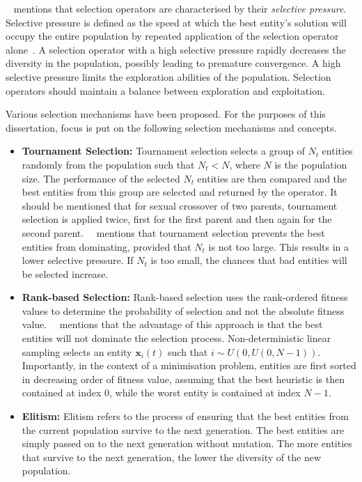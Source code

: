 \citeauthor{ref:engelbrecht:2007}~\cite{ref:engelbrecht:2007} mentions that selection operators are characterised by their \textit{selective pressure}. Selective pressure is defined as the speed at which the best entity's solution will occupy the entire population by repeated application of the selection operator alone~\cite{ref:back:1994}. A selection operator with a high selective pressure rapidly decreases the diversity in the population, possibly leading to premature convergence. A high selective pressure limits the exploration abilities of the population. Selection operators should maintain a balance between exploration and exploitation.

Various selection mechanisms have been proposed. For the purposes of this dissertation, focus is put on the following selection mechanisms and concepts.

\begin{itemize}
      \item \textbf{Tournament Selection:} Tournament selection selects a group of $N_{t}$ entities randomly from the population such that $N_{t} < N$, where $N$ is the population size. The performance of the selected $N_{t}$ entities are then compared and the best entities from this group are selected and returned by the operator. It should be mentioned that for sexual crossover of two parents, tournament selection is applied twice, first for the first parent and then again for the second parent.~\citeauthor{ref:engelbrecht:2007}~\cite{ref:engelbrecht:2007} mentions that tournament selection prevents the best entities from dominating, provided that $N_{t}$ is not too large. This results in a lower selective pressure. If $N_{t}$ is too small, the chances that bad entities will be selected increase.

      \item \textbf{Rank-based Selection:} Rank-based selection uses the rank-ordered fitness values to determine the probability of selection and not the absolute fitness value.~\citeauthor{ref:engelbrecht:2007}~\cite{ref:engelbrecht:2007} mentions that the advantage of this approach is that the best entities will not dominate the selection process. Non-deterministic linear sampling selects an entity $\boldsymbol{x}_{i}(t)$ such that $i \sim U(0, U(0, N - 1))$. Importantly, in the context of a minimisation problem, entities are first sorted in decreasing order of fitness value, assuming that the best heuristic is then contained at index 0, while the worst entity is contained at index $N - 1$.

      \item \textbf{Elitism:} Elitism refers to the process of ensuring that the best entities from the current population survive to the next generation. The best entities are simply passed on to the next generation without mutation. The more entities that survive to the next generation, the lower the diversity of the new population.
\end{itemize}


